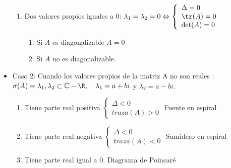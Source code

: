 \begin{itemize}
\begin{enumerate}
\item Dos valores propios iguales a 0: $\lambda_1=\lambda_2=0 \Leftrightarrow \left\{ \begin{array}{ll}\Delta=0 \\ \tr(A)=0 \\ \det(A)=0\end{array}\right.$
\begin{enumerate}
\item Si $A$ es diagonalizable $A=0$
\item Si $A$ no es diagonalizable.
\end{enumerate}
\end{enumerate}
\item Caso 2: Cuando los valores propios de la matriz A no son reales : $\sigma(A)={\lambda_1,\lambda_2}\subset \mathbb{C} - \R, \quad \lambda_1=a+bi$ y $ \lambda_2=a-bi$.
\begin{enumerate}
\item Tiene parte real positiva $\left\{\begin{array}{ll} \Delta < 0 \\ traza(A) > 0 \end{array}\right.$ Fuente en espiral
\item Tiene parte real negativa $\left\{\begin{array}{ll} \Delta < 0 \\ traza(A) < 0 \end{array}\right.$ Sumidero en espiral
\item Tiene parte real igual a 0. Diagrama de Poincaré
\end{enumerate}
\end{itemize}
